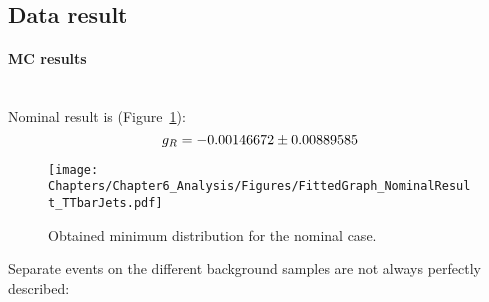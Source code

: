 \subsection{Data result}
\paragraph{MC results } \hfill \\

Nominal result is (Figure~\ref{fig::MinNominal}):
\begin{equation}
 g_{R} = -0.00146672 \pm 0.00889585
\end{equation}

\begin{figure}[h!t]
 \centering
 \texttt{[image: Chapters/Chapter6\_Analysis/Figures/FittedGraph\_NominalResult\_TTbarJets.pdf]}
 \caption{Obtained minimum distribution for the nominal case.} \label{fig::MinNominal}
\end{figure}

Separate events on the different background samples are not always perfectly described:

